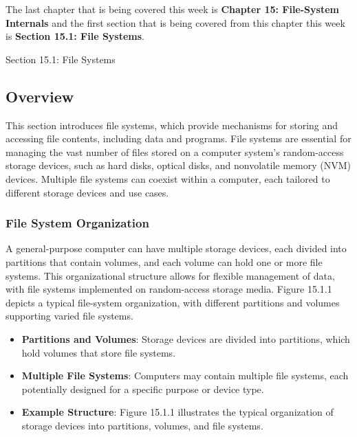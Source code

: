 The last chapter that is being covered this week is \textbf{Chapter 15: File-System Internals} and the first section that is being covered from this chapter this week is \textbf{Section 15.1: File Systems}.

\begin{notes}{Section 15.1: File Systems}
    \subsection*{Overview}

    This section introduces file systems, which provide mechanisms for storing and accessing file contents, including data and programs. File systems are essential for managing the vast number of files 
    stored on a computer system's random-access storage devices, such as hard disks, optical disks, and nonvolatile memory (NVM) devices. Multiple file systems can coexist within a computer, each tailored 
    to different storage devices and use cases.
    
    \subsubsection*{File System Organization}
    
    A general-purpose computer can have multiple storage devices, each divided into partitions that contain volumes, and each volume can hold one or more file systems. This organizational structure allows 
    for flexible management of data, with file systems implemented on random-access storage media. Figure 15.1.1 depicts a typical file-system organization, with different partitions and volumes supporting 
    varied file systems.
    
    \begin{highlight}
    
        \begin{itemize}
            \item \textbf{Partitions and Volumes}: Storage devices are divided into partitions, which hold volumes that store file systems.
            \item \textbf{Multiple File Systems}: Computers may contain multiple file systems, each potentially designed for a specific purpose or device type.
            \item \textbf{Example Structure}: Figure 15.1.1 illustrates the typical organization of storage devices into partitions, volumes, and file systems.
        \end{itemize}
    

\end{highlight}
\end{notes}
